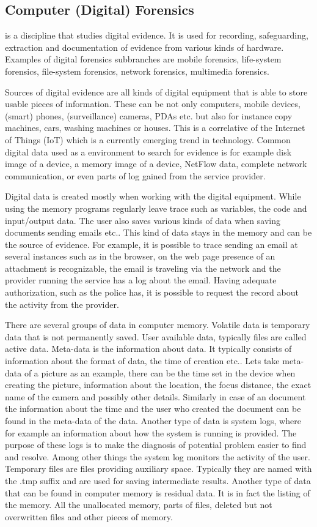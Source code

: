 \subsection{Computer (Digital) Forensics} is a discipline that studies digital evidence. It is used for recording, safeguarding, extraction and documentation of evidence from various kinds of hardware. Examples of digital forensics subbranches are mobile forensics, life-system forensics, file-system forensics, network forensics, multimedia forensics. 

Sources of digital evidence are all kinds of digital equipment that is able to store usable pieces of information. These can be not only computers, mobile devices, (smart) phones, (surveillance) cameras, PDAs etc. but also for instance copy machines, cars, washing machines or houses. This is a correlative of the Internet of Things (IoT) which is a currently emerging trend in technology. Common digital data used as a environment to search for evidence is for example disk image of a device, a memory image of a device, NetFlow data, complete network communication, or even parts of log gained from the service provider. 

Digital data is created mostly when working with the digital equipment. While using the memory programs regularly leave trace such as variables, the code and input/output data. The user also saves various kinds of data when saving documents sending emails etc.. This kind of data stays in the memory and can be the source of evidence. For example, it is possible to trace sending an email at several instances such as in the browser, on the web page presence of an attachment is recognizable, the email is traveling via the network and the provider running the service has a log about the email. Having adequate authorization, such as the police has, it is possible to request the record about the activity from the provider.

There are several groups of data in computer memory. Volatile data is temporary data that is not permanently saved. User available data, typically files are called active data. Meta-data is the information about data. It typically consists of information about the format of data, the time of creation etc.. Lets take meta-data of a picture as an example, there can be the time set in the device when creating the picture, information about the location, the focus distance, the exact name of the camera and possibly other details. Similarly in case of an document the information about the time and the user who created the document can be found in the meta-data of the data. Another type of data is system logs, where for example an information about how the system is running is provided. The purpose of these logs is to make the diagnosis of potential problem easier to find and resolve. Among other things the system log monitors the activity of the user. Temporary files are files providing auxiliary space. Typically they are named with the .tmp suffix and are used for saving intermediate results. Another type of data that can be found in computer memory is residual data. It is in fact the listing of the memory. All the unallocated memory, parts of files, deleted but not overwritten files and other pieces of memory.


